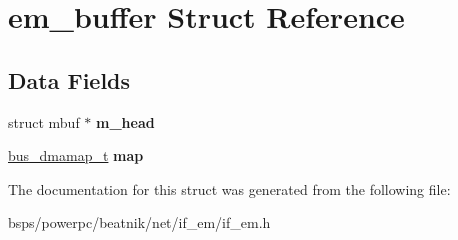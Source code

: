 \hypertarget{structem__buffer}{}\section{em\+\_\+buffer Struct Reference}
\label{structem__buffer}
\subsection*{Data Fields}
\begin{DoxyCompactItemize}
\item 
\mbox{\label{structem__buffer_a8fefc32f86f595366ad21c2a5c4e59be}} 
struct mbuf $\ast$ {\bfseries m\+\_\+head}
\item 
\mbox{\label{structem__buffer_a32ef8c19aca0226cf8ad74a97f21e4d3}} 
\mbox{\hyperlink{structgfe__dmamem}{bus\+\_\+dmamap\+\_\+t}} {\bfseries map}
\end{DoxyCompactItemize}


The documentation for this struct was generated from the following file\+:\begin{DoxyCompactItemize}
\item 
bsps/powerpc/beatnik/net/if\+\_\+em/if\+\_\+em.\+h\end{DoxyCompactItemize}
